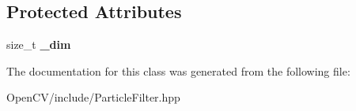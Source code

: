 \subsection*{Protected Attributes}
\begin{DoxyCompactItemize}
\item 
\hypertarget{classskl_1_1_particle_filter_1_1_state_acd1a54086df7417b368c74c6709b169a}{}\label{classskl_1_1_particle_filter_1_1_state_acd1a54086df7417b368c74c6709b169a} 
size\+\_\+t {\bfseries \+\_\+dim}
\end{DoxyCompactItemize}


The documentation for this class was generated from the following file\+:\begin{DoxyCompactItemize}
\item 
Open\+C\+V/include/Particle\+Filter.\+hpp\end{DoxyCompactItemize}
